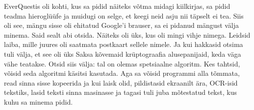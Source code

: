 EverQuestis oli kohti, kus sa pidid näiteks võtma midagi kiilkirjas, sa pidid teadma  hieroglüüfe ja muidugi on selge, et keegi neid asju nii täpselt ei tea. Siis oli see, mängu sisse oli ehitatud Google'i brauser, sa ei pidanud mängust välja minema. Said sealt abi otsida. Näiteks oli üks, kus oli mingi vihje nimega. Leidsid laiba, mille juures oli saatmata postkaart sellele nimele. Ja kui hakkasid otsima tuli välja, et see oli üks Saksa kõvemaid krüptograafia alusepanijaid, keda väga vähe teatakse. Otsid siis välja: tal on olemas spetsiaalne algoritm. Kes tahtsid, võisid seda algoritmi käsitsi kasutada. Aga sa võisid  programmi alla tõmmata, read sinna sisse kopeerida ja kui laisk olid, pildistasid ekraanilt ära, OCR-isid tekstiks, lasid teksti sinna masinasse ja tagasi tuli juba mõtestatud tekst, kus kuhu sa minema pidid.